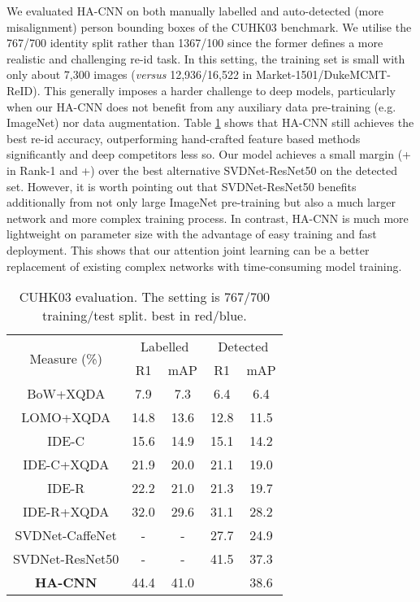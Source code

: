 \documentclass[10pt,twocolumn,letterpaper]{article}
\begin{document}
\vspace{0.05cm}
We evaluated HA-CNN on both manually labelled and 
auto-detected (more misalignment) person bounding boxes of the CUHK03 benchmark. 
We utilise the 767/700 identity split rather than 1367/100 since the former defines a more realistic and challenging re-id task.
In this setting, the training set is small with only about 7,300 images ({\em versus} 12,936/16,522 in Market-1501/DukeMCMT-ReID).
This generally imposes a harder challenge to deep models, particularly 
when our HA-CNN does not benefit from any auxiliary data pre-training
(e.g. ImageNet) nor data augmentation.
Table \ref{tab:res_cuhk03} shows that HA-CNN still achieves the best
re-id accuracy, outperforming hand-crafted feature based methods significantly
and deep competitors less so.
Our model achieves a small margin (+ in Rank-1 and +) over 
the best alternative SVDNet-ResNet50 on the detected set.
However, it is worth pointing out that SVDNet-ResNet50 benefits
additionally from not only large ImageNet pre-training but also a much
larger network and more complex training process. 
In contrast, HA-CNN is much more lightweight on parameter size with the advantage of easy training and fast deployment.   
This shows that our attention joint learning can be a better replacement of 
existing complex networks with time-consuming model training.


\begin{table} [!t]
	\centering
\renewcommand{\arraystretch}{1}
	\setlength{\tabcolsep}{0.2cm}
\caption{CUHK03 evaluation. The setting is 767/700 training/test split.
		 best in red/blue.
	}
\begin{tabular}{|c|cc|cc|}
		\hline
		\multirow{2}{*}{Measure (\%)}
		&  \multicolumn{2}{c|}{Labelled} &\multicolumn{2}{c|}{Detected} \\ \cline{2-5}
		
		& R1 & mAP & R1 & mAP  \\ \hline \hline
		BoW+XQDA \cite{wang2016highly} &  7.9 &  7.3 &  6.4 &  6.4\\   LOMO+XQDA \cite{liao2015person} &  14.8 &  13.6 &  12.8 &  11.5\\   \hline
IDE-C \cite{zhong2017re} &  15.6 &  14.9 &  15.1 &  14.2\\   IDE-C+XQDA \cite{zhong2017re}&  21.9 &  20.0 &  21.1 &  19.0\\   IDE-R \cite{zhong2017re}& 22.2 &  21.0 &  21.3 &19.7 \\   IDE-R+XQDA \cite{zhong2017re} &  \color{blue}32.0 & \color{blue} 29.6 &  31.1 &  28.2\\   SVDNet-CaffeNet \cite{sun2017svdnet} &  - &  -  &  27.7  &  24.9 \\ 
		SVDNet-ResNet50 \cite{sun2017svdnet} &  - &  -  &  \color{blue} {41.5} &  \color{blue} {37.3} \\ 
		\hline
{\bf HA-CNN} &  \color{red} {44.4} &  \color{red} {41.0}  & \color{red}{41.7} &   \color{red} {38.6}  \\ 
		\hline
	\end{tabular}\label{tab:res_cuhk03}
\end{table}
\end{document}
